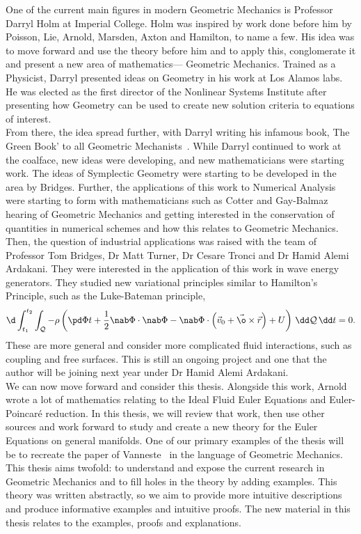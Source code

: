 \noindent
One of the current main figures in modern Geometric Mechanics is Professor Darryl Holm at Imperial College. Holm was inspired by work done before him by Poisson, Lie, Arnold, Marsden, Axton and Hamilton, to name a few. His idea was to move forward and use the theory before him and to apply this, conglomerate it and present a new area of mathematics— Geometric Mechanics. Trained as a Physicist, Darryl presented ideas on Geometry in his work at Los Alamos labs. He was elected as the first director of the Nonlinear Systems Institute after presenting how Geometry can be used to create new solution criteria to equations of interest.\\

\noindent
From there, the idea spread further, with Darryl writing his infamous book, The Green Book' to all Geometric Mechanists~\cite{holm}. While Darryl continued to work at the coalface, new ideas were developing, and new mathematicians were starting work. The ideas of Symplectic Geometry were starting to be developed in the area by Bridges. Further, the applications of this work to Numerical Analysis were starting to form with mathematicians such as Cotter and Gay-Balmaz hearing of Geometric Mechanics and getting interested in the conservation of quantities in numerical schemes and how this relates to Geometric Mechanics. \\

\noindent
Then, the question of industrial applications was raised with the team of Professor Tom Bridges, Dr Matt Turner, Dr Cesare Tronci and Dr Hamid Alemi Ardakani. They were interested in the application of this work in wave energy generators. They studied new variational principles similar to Hamilton's Principle, such as the Luke-Bateman principle,
$$ \d\int_{t_1}^{t_2}\int_{\mathcal{Q}} - \rho \left( \pd \Phi t + \frac{1}{2}\nab\Phi \cdot \nab \Phi - \nab\Phi \cdot \left( \vec v_0 + \vec \o \times \vec r \right) + U \right)\, \dd \mathcal{Q}\,\dd t = 0. $$
These are more general and consider more complicated fluid interactions, such as coupling and free surfaces. This is still an ongoing project and one that the author will be joining next year under Dr Hamid Alemi Ardakani.\\

\noindent
We can now move forward and consider this thesis. Alongside this work, Arnold wrote a lot of mathematics relating to the Ideal Fluid Euler Equations and Euler-Poincar\'e reduction. In this thesis, we will review that work, then use other sources and work forward to study and create a new theory for the Euler Equations on general manifolds. One of our primary examples of the thesis will be to recreate the paper of Vanneste~\cite{vanneste_2021} in the language of Geometric Mechanics. This thesis aims twofold: to understand and expose the current research in Geometric Mechanics and to fill holes in the theory by adding examples. This theory was written abstractly, so we aim to provide more intuitive descriptions and produce informative examples and intuitive proofs. The new material in this thesis relates to the examples, proofs and explanations.\\

